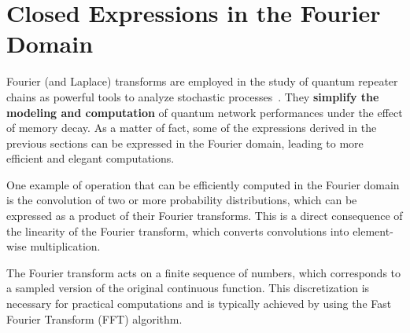 \documentclass{masterthesis}
\begin{document}







\section{Closed Expressions in the Fourier Domain}

Fourier (and Laplace) transforms are employed in the study of quantum repeater chains as powerful tools to analyze stochastic processes~\cite{Kuzmin_2021}. They \textbf{simplify the modeling and computation} of quantum network performances under the effect of memory decay.
As a matter of fact, some of the expressions derived in the previous sections can be expressed in the Fourier domain, leading to more efficient and elegant computations.

One example of operation that can be efficiently computed in the Fourier domain is the convolution of two or more probability distributions, which can be expressed as a product of their Fourier transforms. This is a direct consequence of the linearity of the Fourier transform, which converts convolutions into element-wise multiplication.

The Fourier transform acts on a finite sequence of numbers, which corresponds to a sampled version of the original continuous function. This discretization is necessary for practical computations and is typically achieved by using the Fast Fourier Transform (FFT) algorithm. 
\end{document}

